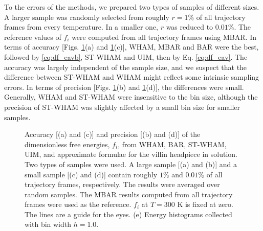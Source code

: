 \documentclass[reprint,aip,jcp,superscriptaddress]{revtex4-1}
\begin{document}
To  the errors of the methods,
we prepared two types of samples of different sizes.
%
A larger sample was randomly selected from roughly $r = 1\%$
of all trajectory frames from every temperature.
%
In a smaller one, $r$ was reduced to $0.01\%$.
%
The reference values of $f_i$
were computed from all trajectory frames using MBAR.
%
In terms of accuracy
[Figs. \ref{fig:whamcmp}(a) and \ref{fig:whamcmp}(c)],
WHAM, MBAR and BAR were the best,
followed by  \eqref{eq:df_eavb},
 ST-WHAM and UIM,
then by Eq. \eqref{eq:df_eav}.
%
The accuracy was largely independent of the sample size,
and we suspect that the difference
between ST-WHAM and WHAM
might reflect some intrinsic sampling errors.
%
%
In terms of precision
[Figs. \ref{fig:whamcmp}(b) and \ref{fig:whamcmp}(d)],
the differences were small.
%
%
Generally,
WHAM and ST-WHAM were insensitive to the bin size,
although the precision of ST-WHAM was slightly affected
by a small bin size for smaller samples.



\begin{figure}[h]
  \caption{
    \label{fig:whamcmp}
    Accuracy [(a) and (c)] and precision [(b) and (d)] of
    the dimensionless free energies, $f_i$,
    from WHAM, BAR, ST-WHAM, UIM, and approximate formulae
    for the villin headpiece in solution.
    Two types of samples were used.
    A large sample [(a) and (b)]
    and
    a small sample [(c) and (d)]
    contain roughly
    $1\%$ and $0.01\%$ of all trajectory frames,
    respectively.
    The results were averaged over random samples.
    The MBAR results computed from all trajectory frames
    were used as the reference.
    $f_i$ at $T = 300$ K is fixed at zero.
    The lines are a guide for the eyes.
    (e) Energy histograms collected
    with bin width $h = 1.0$.
  }
\end{figure}
\end{document}

